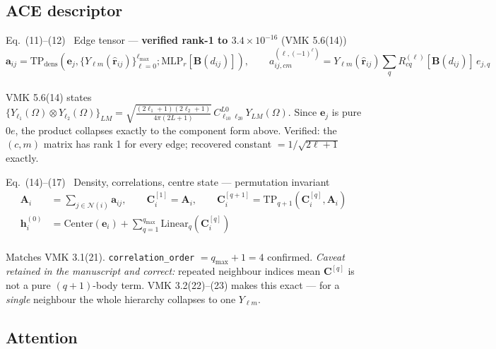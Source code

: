 \documentclass[10pt,a4paper]{article}
\newcommand{\OK}[1]{\textcolor{OKgreen}{#1}}
\newcommand{\rr}{\bm{r}}
\newcommand{\aij}{\bm{a}_{ij}}
\newcommand{\hh}{\bm{h}}
\newcommand{\Ai}{\bm{A}_i}
\newcommand{\code}[1]{\texttt{\small #1}}
\begin{document}
\subsection{ACE descriptor}

\begin{okbox}{Eq.~(11)--(12) \ Edge tensor --- \textbf{verified rank-1 to $3.4\times10^{-16}$} (VMK 5.6(14))}
\vspace{-6pt}
\begin{equation*}
\aij = \mathrm{TP}_{\mathrm{dens}}\!\left(\bm{e}_j,\{Y_{\ell m}(\hat{\rr}_{ij})\}_{\ell=0}^{\ell_{\max}};
\mathrm{MLP}_r[\bm{B}(d_{ij})]\right),
\qquad
a^{(\ell,(-1)^\ell)}_{ij,cm} = Y_{\ell m}(\hat{\rr}_{ij})\sum_q R^{(\ell)}_{cq}[\bm{B}(d_{ij})]\,e_{j,q}
\end{equation*}
\vspace{-10pt}\\
\footnotesize\OK{VMK 5.6(14) states $\{Y_{\ell_1}(\Omega)\otimes Y_{\ell_2}(\Omega)\}_{LM}
= \sqrt{\tfrac{(2\ell_1+1)(2\ell_2+1)}{4\pi(2L+1)}}\,C^{L0}_{\ell_10\ell_20}Y_{LM}(\Omega)$.
Since $\bm e_j$ is pure $0e$, the product collapses exactly to the component form above.
Verified: the $(c,m)$ matrix has rank 1 for every edge; recovered constant $=1/\sqrt{2\ell+1}$ exactly.}
\end{okbox}

\begin{okbox}{Eq.~(14)--(17) \ Density, correlations, centre state --- permutation invariant}
\vspace{-6pt}
\begin{align*}
\Ai &= \sum_{j\in\mathcal N(i)}\aij, \qquad
\bm{C}^{[1]}_i = \Ai, \qquad
\bm{C}^{[q+1]}_i = \mathrm{TP}_{q+1}\!\left(\bm{C}^{[q]}_i,\Ai\right)\\
\hh^{(0)}_i &= \mathrm{Center}(\bm e_i) + \sum_{q=1}^{q_{\max}}\mathrm{Linear}_q\!\left(\bm{C}^{[q]}_i\right)
\end{align*}
\vspace{-10pt}\\
\footnotesize\OK{Matches VMK 3.1(21). \code{correlation\_order} $=q_{\max}+1=4$ confirmed.
\emph{Caveat retained in the manuscript and correct:} repeated neighbour indices mean
$\bm C^{[q]}$ is not a pure $(q{+}1)$-body term. VMK 3.2(22)--(23) makes this exact ---
for a \emph{single} neighbour the whole hierarchy collapses to one $Y_{\ell m}$.}
\end{okbox}

\subsection{Attention}
\end{document}
